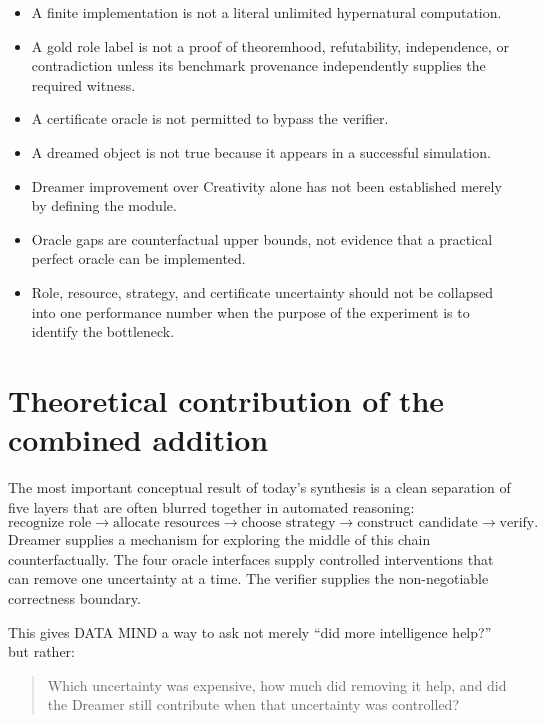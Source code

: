\begin{itemize}
\item A finite implementation is not a literal unlimited hypernatural computation.
\item A gold role label is not a proof of theoremhood, refutability, independence, or contradiction unless its benchmark provenance independently supplies the required witness.
\item A certificate oracle is not permitted to bypass the verifier.
\item A dreamed object is not true because it appears in a successful simulation.
\item Dreamer improvement over Creativity alone has not been established merely by defining the module.
\item Oracle gaps are counterfactual upper bounds, not evidence that a practical perfect oracle can be implemented.
\item Role, resource, strategy, and certificate uncertainty should not be collapsed into one performance number when the purpose of the experiment is to identify the bottleneck.
\end{itemize}

\section{Theoretical contribution of the combined addition}

The most important conceptual result of today's synthesis is a clean separation of five layers that are often blurred together in automated reasoning:
\begin{equation}
\boxed{
\text{recognize role}
\rightarrow
\text{allocate resources}
\rightarrow
\text{choose strategy}
\rightarrow
\text{construct candidate}
\rightarrow
\text{verify}.
}
\end{equation}
Dreamer supplies a mechanism for exploring the middle of this chain counterfactually. The four oracle interfaces supply controlled interventions that can remove one uncertainty at a time. The verifier supplies the non-negotiable correctness boundary.

This gives DATA MIND a way to ask not merely ``did more intelligence help?'' but rather:
\begin{quote}
Which uncertainty was expensive, how much did removing it help, and did the Dreamer still contribute when that uncertainty was controlled?
\end{quote}

